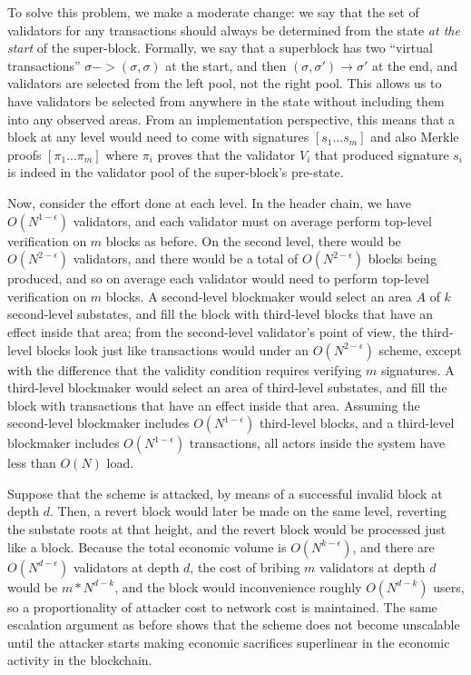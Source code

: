 \documentclass[11pt,a4paper]{report}
\theoremstyle{plain}
\theoremstyle{definition}
\theoremstyle{remark}
\begin{document}
To solve this problem, we make a moderate change: we say that the set of validators for any transactions should always be determined from the state \emph{at the start} of the super-block. Formally, we say that a superblock has two ``virtual transactions'' $\sigma -> (\sigma, \sigma)$ at the start, and then $(\sigma, \sigma') \rightarrow \sigma'$ at the end, and validators are selected from the left pool, not the right pool. This allows us to have validators be selected from anywhere in the state without including them into any observed areas. From an implementation perspective, this means that a block at any level would need to come with signatures $[s_1 ... s_m]$ and also Merkle proofs $[\pi_1 ... \pi_m]$ where $\pi_i$ proves that the validator $V_i$ that produced signature $s_i$ is indeed in the validator pool of the super-block's pre-state.

Now, consider the effort done at each level. In the header chain, we have $O(N^{1-\epsilon})$ validators, and each validator must on average perform top-level verification on $m$ blocks as before. On the second level, there would be $O(N^{2-\epsilon})$ validators, and there would be a total of $O(N^{2-\epsilon})$ blocks being produced, and so on average each validator would need to perform top-level verification on $m$ blocks. A second-level blockmaker would select an area $A$ of $k$ second-level substates, and fill the block with third-level blocks that have an effect inside that area; from the second-level validator's point of view, the third-level blocks look just like transactions would under an $O(N^{2-\epsilon})$ scheme, except with the difference that the validity condition requires verifying $m$ signatures. A third-level blockmaker would select an area of third-level substates, and fill the block with transactions that have an effect inside that area. Assuming the second-level blockmaker includes $O(N^{1-\epsilon})$ third-level blocks, and a third-level blockmaker includes $O(N^{1-\epsilon})$ transactions, all actors inside the system have less than $O(N)$ load.

Suppose that the scheme is attacked, by means of a successful invalid block at depth $d$. Then, a revert block would later be made on the same level, reverting the substate roots at that height, and the revert block would be processed just like a block. Because the total economic volume is $O(N^{k-\epsilon})$, and there are $O(N^{d-\epsilon})$ validators at depth $d$, the cost of bribing $m$ validators at depth $d$ would be $m * N^{d - k}$, and the block would inconvenience roughly $O(N^{d - k})$ users, so a proportionality of attacker cost to network cost is maintained. The same escalation argument as before shows that the scheme does not become unscalable until the attacker starts making economic sacrifices superlinear in the economic activity in the blockchain.
\end{document}
